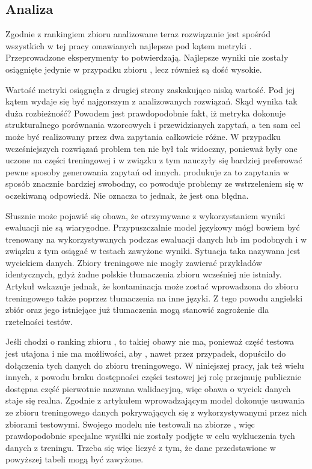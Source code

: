 \subsection{Analiza}
Zgodnie z rankingiem zbioru  analizowane teraz rozwiązanie jest spośród wszystkich w tej pracy omawianych najlepsze pod kątem metryki . Przeprowadzone eksperymenty to potwierdzają. Najlepsze wyniki nie zostały osiągnięte jedynie w przypadku zbioru , lecz również są dość wysokie.

Wartość metryki  osiągnęła z drugiej strony zaskakująco niską wartość. Pod jej kątem  wydaje się być najgorszym z analizowanych rozwiązań. Skąd wynika tak duża rozbieżność? Powodem jest prawdopodobnie fakt, iż metryka  dokonuje strukturalnego porównania wzorcowych i przewidzianych  zapytań, a ten sam cel może być realizowany przez dwa zapytania całkowicie różne. W przypadku wcześniejszych rozwiązań problem ten nie był tak widoczny, ponieważ były one uczone na części treningowej i w związku z tym nauczyły się bardziej preferować pewne sposoby generowania zapytań od innych.  produkuje za to zapytania w sposób znacznie bardziej swobodny, co powoduje problemy ze wstrzeleniem się w oczekiwaną odpowiedź. Nie oznacza to jednak, że jest ona błędna. 

Słusznie może pojawić się obawa, że otrzymywane z wykorzystaniem  wyniki ewaluacji nie są wiarygodne. Przypuszczalnie model językowy  mógł bowiem być trenowany na wykorzystywanych podczas ewaluacji danych lub im podobnych i w związku z tym osiągać w testach zawyżone wyniki. Sytuacja taka nazywana jest wyciekiem danych. Zbiory treningowe nie mogły zawierać przykładów identycznych, gdyż żadne polskie tłumaczenia zbioru  wcześniej nie istniały. Artykuł   wskazuje jednak, że kontaminacja może zostać wprowadzona do zbioru treningowego także poprzez tłumaczenia na inne języki. Z tego powodu angielski zbiór  oraz jego istniejące już tłumaczenia mogą stanowić zagrożenie dla rzetelności testów.

Jeśli chodzi o ranking zbioru , to takiej obawy nie ma, ponieważ część testowa jest utajona i nie ma możliwości, aby , nawet przez przypadek, dopuściło do dołączenia tych danych do zbioru treningowego. W niniejszej pracy, jak też wielu innych, z powodu braku dostępności części testowej jej rolę przejmuję publicznie dostępna część pierwotnie nazwana walidacyjną, więc obawa o wyciek danych staje się realna. Zgodnie z artykułem wprowadzającym model \mbox{}   dokonuje usuwania ze zbioru treningowego danych pokrywających się z wykorzystywanymi przez nich zbiorami testowymi. Swojego modelu nie testowali na zbiorze , więc prawdopodobnie specjalne wysiłki nie zostały podjęte w celu wykluczenia tych danych z treningu. Trzeba się więc liczyć z tym, że dane przedstawione w powyższej tabeli mogą być zawyżone.

